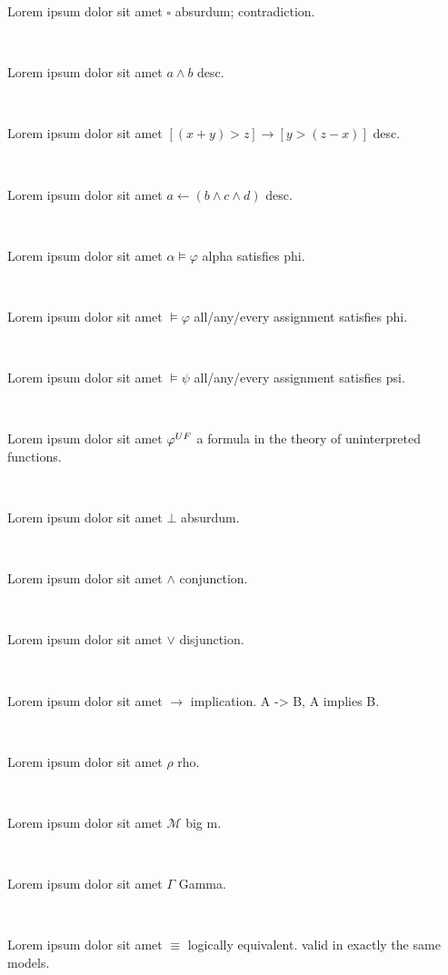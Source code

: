 \documentclass[12pt]{article}
\begin{document}
Lorem ipsum dolor sit amet $ \square $ absurdum; contradiction.

\centerline{~}


Lorem ipsum dolor sit amet $ a \wedge b $ desc.

\centerline{~}


Lorem ipsum dolor sit amet $ [ ( x + y ) > z ] \rightarrow [ y > ( z - x ) ] $ desc.

\centerline{~}


Lorem ipsum dolor sit amet $ a \leftarrow ( b \wedge c \wedge d )  $ desc.

\centerline{~}

Lorem ipsum dolor sit amet $ \alpha \vDash \varphi $ alpha satisfies phi.

\centerline{~}

Lorem ipsum dolor sit amet $ \vDash \varphi $ all/any/every assignment satisfies phi.

\centerline{~}

Lorem ipsum dolor sit amet $ \vDash \psi $ all/any/every assignment satisfies psi.

\centerline{~}

Lorem ipsum dolor sit amet $ \varphi^{\scriptsize UF} $ a formula in the theory of uninterpreted functions.

\centerline{~}

Lorem ipsum dolor sit amet $ \bot $ absurdum.

\centerline{~}

Lorem ipsum dolor sit amet $ \wedge $ conjunction.

\centerline{~}

Lorem ipsum dolor sit amet $ \vee $ disjunction.

\centerline{~}

Lorem ipsum dolor sit amet $ \rightarrow $ implication.  A -> B,  A implies B.

\centerline{~}

Lorem ipsum dolor sit amet $ \rho $ rho.

\centerline{~}

Lorem ipsum dolor sit amet $ \mathcal{M} $ big m.

\centerline{~}

Lorem ipsum dolor sit amet $ \Gamma $ Gamma.

\centerline{~}

Lorem ipsum dolor sit amet $ \equiv $ logically equivalent. valid in exactly the same models.

\centerline{~}
\end{document}
